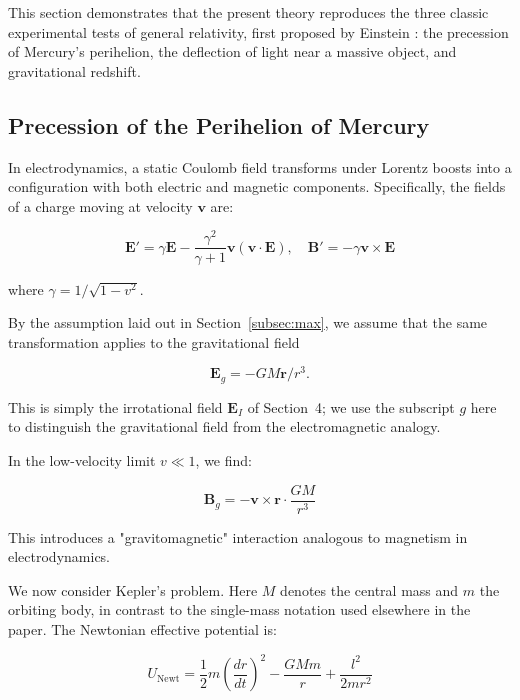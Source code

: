 \documentclass {article}
\renewcommand\vec{\mathbf}
\begin{document}
This section demonstrates that the present theory reproduces the three classic experimental tests of general relativity, first proposed by Einstein \cite{einstein1916}: the precession of Mercury's perihelion, the deflection of light near a massive object, and gravitational redshift.

\subsection{Precession of the Perihelion of Mercury}

In electrodynamics, a static Coulomb field transforms under Lorentz boosts into a configuration with both electric and magnetic components. Specifically, the fields of a charge moving at velocity \( \vec{v} \) are:

\begin{equation}
\vec{E}' = \gamma \vec{E} - \frac{\gamma^2}{\gamma + 1} \vec{v} (\vec{v} \cdot \vec{E}), \quad
\vec{B}' = - \gamma \vec{v} \times \vec{E}
\end{equation}

\noindent where \( \gamma = 1 / \sqrt{1 - v^2} \).
 
 By the assumption laid out in Section~\ref{subsec:max}, we assume that the same transformation applies to the gravitational field 
 
 \begin{equation}
 \vec{E}_g = -GM\vec{r}/r^3. 
 \end{equation}
 
 \noindent This is simply the irrotational field $\vec{E}_I$ of Section~4; we use the subscript $g$ here to distinguish the gravitational field from the electromagnetic analogy.
 
In the low-velocity limit $v \ll 1$, we find:
 
 \begin{equation}
 \vec{B}_g = -\vec{v} \times \vec{r} \cdot \frac{GM}{r^3}
 \end{equation}
 

This introduces a "gravitomagnetic" interaction analogous to magnetism in electrodynamics. 



We now consider Kepler’s problem. Here $M$ denotes the central mass and $m$ the orbiting body, in contrast to the single-mass notation used elsewhere in the paper. The Newtonian effective potential is:




\begin{equation}
U_{\text{Newt}} = \frac{1}{2} m \left( \frac{dr}{dt} \right)^2 - \frac{GMm}{r} + \frac{l^2}{2 m r^2}
\end{equation}
\end{document}

